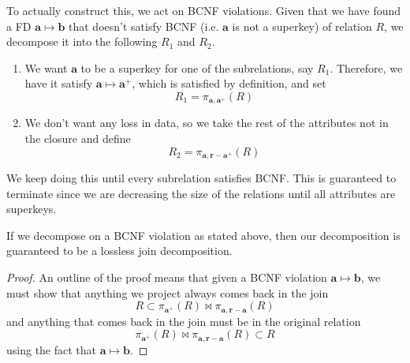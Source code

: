 \documentclass{article}
\begin{document}
    \begin{algo}
      To actually construct this, we act on BCNF violations. Given that we have found a FD $\mathbf{a} \mapsto \mathbf{b}$ that doesn't satisfy BCNF (i.e. $\mathbf{a}$ is not a superkey) of relation $R$, we decompose it into the following $R_1$ and $R_2$. 
      \begin{enumerate}
        \item We want $\mathbf{a}$ to be a superkey for one of the subrelations, say $R_1$. Therefore, we have it satisfy $\mathbf{a} \mapsto \mathbf{a}^+$, which is satisfied by definition, and set 
          \begin{equation}
            R_1 = \pi_{\mathbf{a}, \mathbf{a}^+} (R)
          \end{equation}
        \item We don't want any loss in data, so we take the rest of the attributes not in the closure and define  
          \begin{equation}
            R_2 = \pi_{\mathbf{a}, \mathbf{r} - \mathbf{a}^+} (R)
          \end{equation}
      \end{enumerate}
      We keep doing this until every subrelation satisfies BCNF. This is guaranteed to terminate since we are decreasing the size of the relations until all attributes are superkeys.  
    \end{algo}

    \begin{theorem}
      If we decompose on a BCNF violation as stated above, then our decomposition is guaranteed to be a lossless join decomposition. 
    \end{theorem}
    \begin{proof}
      An outline of the proof means that given a BCNF violation $\mathbf{a} \mapsto \mathbf{b}$, we must show that anything we project always comes back in the join
      \begin{equation}
        R \subset \pi_{\mathbf{a}^+} (R) \bowtie \pi_{\mathbf{a}, \mathbf{r} - \mathbf{a}} (R)
      \end{equation}
      and anything that comes back in the join must be in the original relation 
      \begin{equation}
        \pi_{\mathbf{a}^+} (R) \bowtie \pi_{\mathbf{a}, \mathbf{r} - \mathbf{a}} (R) \subset R
      \end{equation}
      using the fact that $\mathbf{a} \mapsto \mathbf{b}$. 
    \end{proof}
\end{document}

